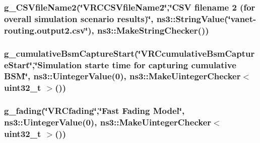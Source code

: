 \subsubsection[{\texorpdfstring{g\+\_\+\+C\+S\+Vfile\+Name2}{g_CSVfileName2}}]{ g\+\_\+\+C\+S\+Vfile\+Name2(\char`\"{}V\+R\+C\+C\+S\+Vfile\+Name2\char`\"{},\char`\"{}C\+SV filename 2 (for overall simulation scenario results)\char`\"{}, ns3\+::\+String\+Value(\char`\"{}vanet-\/routing.\+output2.\+csv\char`\"{}), ns3\+::\+Make\+String\+Checker())\hspace{0.3cm}{\ttfamily [static]}}\hypertarget{vanet-routing-compare_8cc_ae5fc8882d794b8f5c71805e05e1b8e01}{}\label{vanet-routing-compare_8cc_ae5fc8882d794b8f5c71805e05e1b8e01}
\subsubsection[{\texorpdfstring{g\+\_\+cumulative\+Bsm\+Capture\+Start}{g_cumulativeBsmCaptureStart}}]{ g\+\_\+cumulative\+Bsm\+Capture\+Start(\char`\"{}V\+R\+Ccumulative\+Bsm\+Capture\+Start\char`\"{},\char`\"{}Simulation starte time for capturing cumulative B\+SM\char`\"{}, ns3\+::\+Uinteger\+Value(0), {\bf ns3\+::\+Make\+Uinteger\+Checker}$<$ uint32\+\_\+t $>$())\hspace{0.3cm}{\ttfamily [static]}}\hypertarget{vanet-routing-compare_8cc_a1324251d8e66b676c46cc6a261bfd7ad}{}\label{vanet-routing-compare_8cc_a1324251d8e66b676c46cc6a261bfd7ad}
\subsubsection[{\texorpdfstring{g\+\_\+fading}{g_fading}}]{ g\+\_\+fading(\char`\"{}V\+R\+Cfading\char`\"{},\char`\"{}Fast Fading Model\char`\"{}, ns3\+::\+Uinteger\+Value(0), {\bf ns3\+::\+Make\+Uinteger\+Checker}$<$ uint32\+\_\+t $>$())\hspace{0.3cm}{\ttfamily [static]}}\hypertarget{vanet-routing-compare_8cc_a637f57292a68174c5c3916051172b921}{}\label{vanet-routing-compare_8cc_a637f57292a68174c5c3916051172b921}

